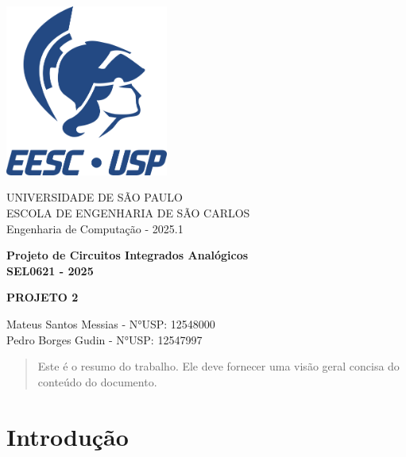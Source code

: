 \documentclass[12pt,a4paper]{article}
\newcommand{\imprimirMateria}{Projeto de Circuitos Integrados Analógicos}
\newcommand{\imprimirCodMateria}{SEL0621}
\newcommand{\imprimirTitulo}{Projeto 2}
\newcommand{\imprimirSubtitulo}{Engenharia de Computação}
\newcommand{\imprimirAutores}{Mateus Santos Messias - N°USP: 12548000 \\ Pedro Borges Gudin - N°USP: 12547997}
\newcommand{\imprimirAno}{2025}
\begin{document}
\begin{titlepage}
    \begin{center}
        \vspace*{0.5cm}
        \includegraphics[width=0.4\textwidth]{images/Logo EESC-USP - Vertical Monocromatico Azul (ECM).png}
            
        \Large
        \vspace{1cm}
        UNIVERSIDADE DE SÃO PAULO\\
        ESCOLA DE ENGENHARIA DE SÃO CARLOS\\
        \imprimirSubtitulo{} - \imprimirAno.1
        

        \vspace{2cm}
        \LARGE
        \t\textbf{
            \imprimirMateria{}\\
            \imprimirCodMateria{} - \imprimirAno
        }
        
        \vspace{3.5cm}
        \Huge
        \uppercase{\t\textbf{\imprimirTitulo}}
        
        \vfill
        
        \large
        \imprimirAutores
        
        \vspace{2cm}
        
    \end{center}
\end{titlepage}

\newpage

\begin{abstract}
Este é o resumo do trabalho. Ele deve fornecer uma visão geral concisa do conteúdo do documento.
\end{abstract}

\newpage
\tableofcontents
\newpage

\section*{Introdução}
\end{document}

